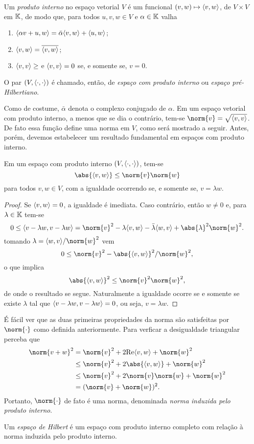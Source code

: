 \begin{defn}
    Um \emph{produto interno} no espaço vetorial \( V \) é um funcional \( (v, w) \mapsto \langle v,w\rangle \), de \( V \times V \) em \( \mathbb{K} \), de modo que, para todos \( u, v, w \in V \) e \( \alpha \in \mathbb{K} \) valha
    \begin{enumerate}[label=\roman*)]
        \item \( \langle\alpha v + u, w\rangle = \bar{\alpha} \langle v, w\rangle + \langle u, w\rangle \);
        \item \( \langle v, w\rangle = \overline{\langle v,w\rangle} \);
        \item \( \langle v, v\rangle \geq \) e \( \langle v, v\rangle = 0 \) se, e somente se, \( v = 0 \).
    \end{enumerate}
    O par \( (V, \langle\cdot,\cdot\rangle) \) é chamado, então, de \emph{espaço com produto interno} ou \emph{espaço pré-Hilbertiano}.
\end{defn}
Como de costume, \( \bar{\alpha} \) denota o complexo conjugado de \( \alpha \).
Em um espaço vetorial com produto interno, a menos que se dia o contrário, tem-se \( \norm{ v } = \sqrt{ \dotprod{v,v} } \).
De fato essa função define uma norma em \( V \), como será mostrado a seguir.
Antes, porém, devemos estabelecer um resultado fundamental em espaços com produto interno.
\begin{teo}
    Em um espaço com produto interno \( (V, \langle\cdot,\cdot\rangle) \), tem-se \[
        \abs{ \dotprod{v, w} } \leq \norm{ v } \norm{ w }
    \]
    para todos \( v, w \in V \), com a igualdade ocorrendo se, e somente se, \( v = \lambda w \).
\end{teo}
\begin{proof}
    Se \( \langle v, w\rangle = 0 \), a igualdade é imediata.
    Caso contrário, então \( w \neq 0 \) e, para \( \lambda \in \mathbb{K} \) tem-se \[
        0 \leq \dotprod{v - \lambda w, v - \lambda w} = \norm{ v }^2 -\lambda \dotprod{v, w} -\bar{\lambda} \dotprod{w, v} + \abs{ \lambda }^2 \norm{ w }^2
    .\]
    tomando \( \lambda = \dotprod{w, v}/\norm{ w }^2 \) vem \[
        0 \leq \norm{ v }^2 - \abs{ \dotprod{v, w} }^2/ \norm{ w }^2
    ,\]
    o que implica \[
        \abs{ \dotprod{v, w} }^2 \leq \norm{ v }^2 \norm{ w }^2
    ,\]
    de onde o resultado se segue.
    Naturalmente a igualdade ocorre se e somente se existe \( \lambda \) tal que \( \langle v - \lambda w, v - \lambda w\rangle = 0 \), ou seja, \( v = \lambda w \).
\end{proof}

É fácil ver que as duas primeiras propriedades da norma são satisfeitas por \( \norm{ \cdot } \) como definida anteriormente.
Para verficar a desigualdade triangular perceba que
\begin{align*}
    \norm{ v + w }^2
    &= \norm{ v }^2 + 2 \Re \dotprod{v, w} + \norm{ w }^2 \\
    &\leq \norm{ v }^2 + 2 \abs{ \dotprod{v, w} } + \norm{ w }^2 \\
    &\leq \norm{ v }^2 + 2 \norm{ v } \norm{ w } + \norm{ w }^2 \\
    &= ( \norm{ v } + \norm{ w } )^2
.\end{align*}
Portanto, \( \norm{ \cdot } \) de fato é uma norma, denominada \emph{norma induzida pelo produto interno}.

\begin{defn}
    Um \emph{espaço de Hilbert} é um espaço com produto interno completo com relação à norma induzida pelo produto interno.
\end{defn}